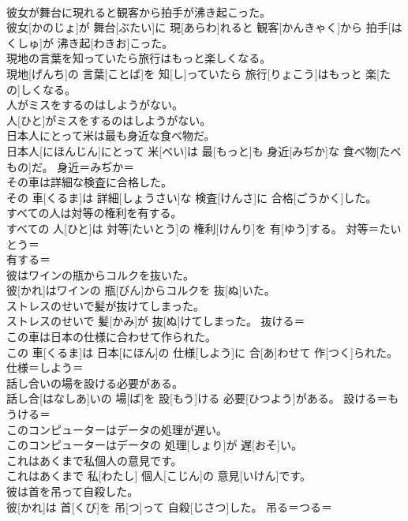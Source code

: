 \documentclass[8pt]{extreport}
\begin{document}
\begin{CJK}{UTF8}{min}
\\	彼女が舞台に現れると観客から拍手が沸き起こった。	
\\	彼女[かのじょ]が 舞台[ぶたい]に 現[あらわ]れると 観客[かんきゃく]から 拍手[はくしゅ]が 沸き起[わきお]こった。	
\\	現地の言葉を知っていたら旅行はもっと楽しくなる。	
\\	現地[げんち]の 言葉[ことば]を 知[し]っていたら 旅行[りょこう]はもっと 楽[たの]しくなる。	
\\	人がミスをするのはしようがない。	
\\	人[ひと]がミスをするのはしようがない。	
\\	日本人にとって米は最も身近な食べ物だ。	
\\	日本人[にほんじん]にとって 米[べい]は 最[もっと]も 身近[みぢか]な 食べ物[たべもの]だ。	身近＝みぢか＝ 
\\	その車は詳細な検査に合格した。	
\\	その 車[くるま]は 詳細[しょうさい]な 検査[けんさ]に 合格[ごうかく]した。	
\\	すべての人は対等の権利を有する。	
\\	すべての 人[ひと]は 対等[たいとう]の 権利[けんり]を 有[ゆう]する。	対等＝たいとう＝ 
\\	有する＝ 
\\	彼はワインの瓶からコルクを抜いた。	
\\	彼[かれ]はワインの 瓶[びん]からコルクを 抜[ぬ]いた。	
\\	ストレスのせいで髪が抜けてしまった。	
\\	ストレスのせいで 髪[かみ]が 抜[ぬ]けてしまった。	抜ける＝ 
\\	この車は日本の仕様に合わせて作られた。	
\\	この 車[くるま]は 日本[にほん]の 仕様[しよう]に 合[あ]わせて 作[つく]られた。	仕様＝しよう＝ 
\\	話し合いの場を設ける必要がある。	
\\	話し合[はなしあ]いの 場[ば]を 設[もう]ける 必要[ひつよう]がある。	設ける＝もうける＝ 
\\	このコンピューターはデータの処理が遅い。	
\\	このコンピューターはデータの 処理[しょり]が 遅[おそ]い。	
\\	これはあくまで私個人の意見です。	
\\	これはあくまで 私[わたし] 個人[こじん]の 意見[いけん]です。	
\\	彼は首を吊って自殺した。	
\\	彼[かれ]は 首[くび]を 吊[つ]って 自殺[じさつ]した。	吊る＝つる＝ 

\end{CJK}
\end{document}
